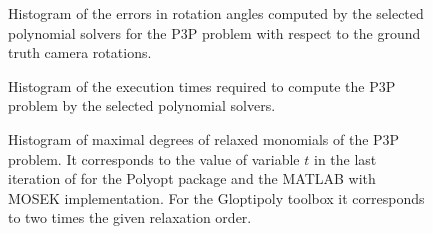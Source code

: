 \begin{figure}[ht]
  \centering
  \resizebox{0.95\textwidth}{!}{}
  \caption{Histogram of the errors in rotation angles computed by the selected polynomial solvers for the P3P problem with respect to the ground truth camera rotations.}
\end{figure}

\begin{figure}[ht]
  \centering
  \resizebox{0.95\textwidth}{!}{}
  \caption{Histogram of the execution times required to compute the P3P problem by the selected polynomial solvers.}
\end{figure}

\begin{figure}[ht]
  \centering
  \resizebox{0.95\textwidth}{!}{}
  \caption{Histogram of maximal degrees of relaxed monomials of the P3P problem. It corresponds to the value of variable $t$ in the last iteration of  for the Polyopt package and the MATLAB with MOSEK implementation. For the Gloptipoly toolbox it corresponds to two times the given relaxation order.}
\end{figure}

